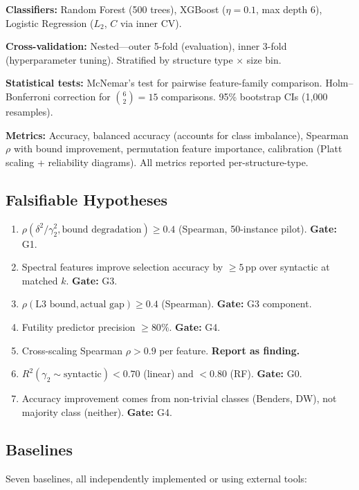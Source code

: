 \documentclass[12pt]{article}
\begin{document}
\textbf{Classifiers:} Random Forest (500 trees), XGBoost ($\eta = 0.1$,
max depth 6), Logistic Regression ($L_2$, $C$ via inner CV).

\textbf{Cross-validation:} Nested---outer 5-fold (evaluation), inner 3-fold
(hyperparameter tuning).  Stratified by structure type $\times$ size bin.

\textbf{Statistical tests:} McNemar's test for pairwise feature-family
comparison.  Holm--Bonferroni correction for $\binom{6}{2} = 15$
comparisons.  95\% bootstrap CIs (1,000 resamples).

\textbf{Metrics:} Accuracy, balanced accuracy (accounts for class imbalance),
Spearman $\rho$ with bound improvement, permutation feature importance,
calibration (Platt scaling + reliability diagrams).  All metrics reported
per-structure-type.

\subsection{Falsifiable Hypotheses}
\label{sec:hypotheses}

\begin{enumerate}[label=\textbf{H\arabic*.}]
\item $\rho(\delta^2/\gamma_2^2, \text{bound degradation}) \geq 0.4$
  (Spearman, 50-instance pilot). \textbf{Gate:} G1.
\item Spectral features improve selection accuracy by $\geq 5$\,pp over
  syntactic at matched $k$.  \textbf{Gate:} G3.
\item $\rho(\text{L3 bound}, \text{actual gap}) \geq 0.4$ (Spearman).
  \textbf{Gate:} G3 component.
\item Futility predictor precision $\geq 80\%$.  \textbf{Gate:} G4.
\item Cross-scaling Spearman $\rho > 0.9$ per feature.
  \textbf{Report as finding.}
\item $R^2(\gamma_2 \sim \text{syntactic}) < 0.70$ (linear) and $< 0.80$
  (RF).  \textbf{Gate:} G0.
\item Accuracy improvement comes from non-trivial classes (Benders, DW),
  not majority class (neither).  \textbf{Gate:} G4.
\end{enumerate}

\subsection{Baselines}
\label{sec:baselines}

Seven baselines, all independently implemented or using external tools:
\end{document}
